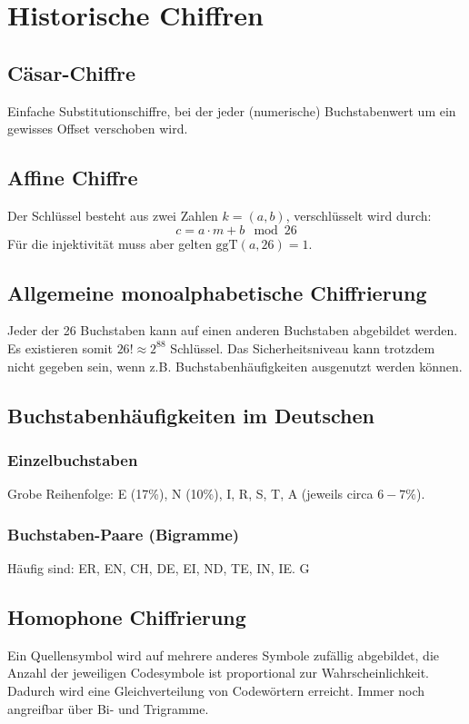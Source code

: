\chapter{Historische Chiffren}
\section{Cäsar-Chiffre}
Einfache Substitutionschiffre, bei der jeder (numerische) Buchstabenwert um ein gewisses Offset verschoben wird.

\section{Affine Chiffre}
Der Schlüssel besteht aus zwei Zahlen $k=(a,b)$, verschlüsselt wird durch:
\begin{equation}
    c= a \cdot m + b \mod 26
\end{equation}
Für die injektivität muss aber gelten $\text{ggT}(a, 26) = 1$.

\section{Allgemeine monoalphabetische Chiffrierung}
Jeder der 26 Buchstaben kann auf einen anderen Buchstaben abgebildet werden. Es existieren somit $26! \approx 2^{88}$ Schlüssel. Das Sicherheitsniveau kann trotzdem nicht gegeben sein, wenn z.B. Buchstabenhäufigkeiten ausgenutzt werden können.

\section{Buchstabenhäufigkeiten im Deutschen}
\subsection{Einzelbuchstaben}
Grobe Reihenfolge: E (17\%), N (10\%), I, R, S, T, A (jeweils circa $6-7\%$).

\subsection{Buchstaben-Paare (Bigramme)}
Häufig sind: ER, EN, CH, DE, EI, ND, TE, IN, IE.
G
\section{Homophone Chiffrierung}
Ein Quellensymbol wird auf mehrere anderes Symbole zufällig abgebildet, die Anzahl der
jeweiligen Codesymbole ist proportional zur Wahrscheinlichkeit.
Dadurch wird eine Gleichverteilung von Codewörtern erreicht.
Immer noch angreifbar über Bi- und Trigramme.

